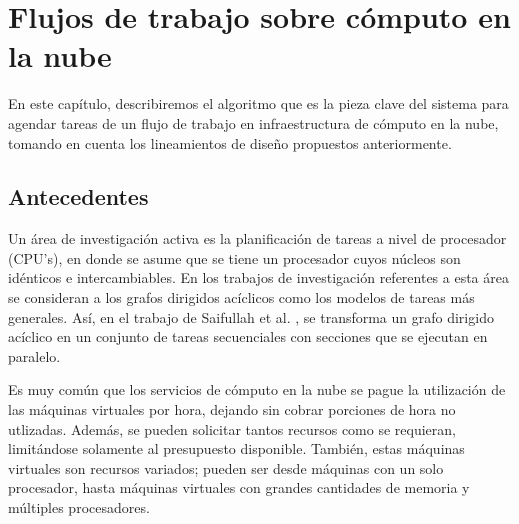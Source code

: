 \chapter[Algoritmos]{Flujos de trabajo sobre cómputo en la nube}
\label{chap:algorithm}

En este capítulo, describiremos el algoritmo que es la pieza clave del sistema para agendar tareas de un flujo de trabajo en infraestructura de cómputo en la nube, tomando en cuenta los lineamientos de diseño propuestos anteriormente.



\section{Antecedentes}

Un área de investigación activa es la planificación de tareas a nivel de procesador (CPU's), en donde se asume que se tiene un procesador cuyos núcleos son idénticos e intercambiables. En los trabajos de investigación referentes a esta área se consideran a los grafos dirigidos acíclicos como los modelos de tareas más generales. Así, en el trabajo de Saifullah et al. \cite{saifullah2013multi}, se transforma un grafo dirigido acíclico en un conjunto de tareas secuenciales con secciones que se ejecutan en paralelo.







Es muy común que los servicios de cómputo en la nube se pague la utilización de las máquinas virtuales por hora, dejando sin cobrar porciones de hora no utlizadas. Además, se pueden solicitar tantos recursos como se requieran, limitándose solamente al presupuesto disponible. Tambi\'en, estas máquinas virtuales son recursos variados; pueden ser desde máquinas con un solo procesador, hasta m\'aquinas virtuales con grandes cantidades de memoria y m\'ultiples procesadores.

